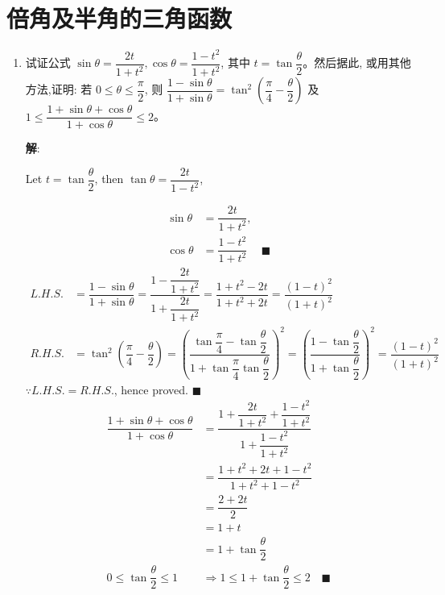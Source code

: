 \documentclass{report}
\newcommand{\sol}{\vspace{0.2cm}\textbf{解}:}
\begin{document}
\setcounter{chapter}{8}
\setcounter{section}{2}

\section{倍角及半角的三角函数}

\allowdisplaybreaks
    \begin{enumerate}[leftmargin=*]
        \item 试证公式 $\sin \theta=\dfrac{2 t}{1+t^2}, \cos \theta=\dfrac{1-t^2}{1+t^2}$, 其中 $t=\tan \dfrac{\theta}{2}$。然后据此, 或用其他方法,证明: 若 $0 \leq \theta \leq \dfrac{\pi}{2}$, 则 $\dfrac{1-\sin \theta}{1+\sin \theta}=\tan ^2\left(\dfrac{\pi}{4}-\dfrac{\theta}{2}\right)$ 及 $1 \leq \dfrac{1+\sin \theta+\cos \theta}{1+\cos \theta} \leq 2$。
        
        \sol{}
        
        Let $t=\tan \dfrac{\theta}{2}$, then $\tan \theta=\dfrac{2 t}{1-t^2}$,
       \begin{center}
       \end{center}
        \begin{align*}
            \sin \theta &= \dfrac{2t}{1+t^2},\\
            \cos \theta &= \dfrac{1-t^2}{1+t^2} & \blacksquare
        \end{align*}
        \begin{align*}
            L.H.S. &= \dfrac{1-\sin \theta}{1+\sin \theta} = \dfrac{1-\dfrac{2t}{1+t^2}}{1+\dfrac{2t}{1+t^2}} = \dfrac{1+t^2-2t}{1+t^2+2t} = \dfrac{(1-t)^2}{(1+t)^2}\\
            R.H.S. &= \tan^2\left(\dfrac{\pi}{4}-\dfrac{\theta}{2}\right) = \left(\dfrac{\tan\dfrac{\pi}{4}-\tan\dfrac{\theta}{2}}{1+\tan\dfrac{\pi}{4}\tan\dfrac{\theta}{2}}\right)^2 = \left(\dfrac{1-\tan\dfrac{\theta}{2}}{1+\tan\dfrac{\theta}{2}}\right)^2 = \dfrac{(1-t)^2}{(1+t)^2}
        \end{align*}
        $\because L.H.S. = R.H.S.$, hence proved. \hfill $\blacksquare$
        \begin{align*}
            \dfrac{1+\sin \theta+\cos \theta}{1+\cos \theta} &= \dfrac{1+\dfrac{2t}{1+t^2}+\dfrac{1-t^2}{1+t^2}}{1+\dfrac{1-t^2}{1+t^2}}\\
            & = \dfrac{1+t^2+2t+1-t^2}{1+t^2+1-t^2}\\
            & = \dfrac{2+2t}{2}\\
            & = 1+t\\
            & = 1+\tan\dfrac{\theta}{2}\\
            0 \leq \tan\dfrac{\theta}{2} \leq 1 &\Rightarrow 1 \leq 1+\tan\dfrac{\theta}{2} \leq 2 & \blacksquare
        \end{align*}
        

\end{enumerate}
\end{document}
